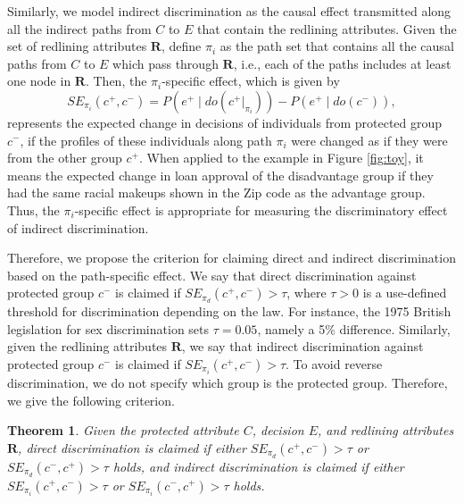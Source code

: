 \documentclass[letterpaper]{article}
\newtheorem{theorem}{Theorem}
\begin{document}
Similarly, we model indirect discrimination as the causal effect transmitted along all the indirect paths from $C$ to $E$ that contain the redlining attributes. Given the set of redlining attributes $\mathbf{R}$, define $\pi_{i}$ as the path set that contains all the causal paths from $C$ to $E$ which pass through $\mathbf{R}$, i.e., each of the paths includes at least one node in $\mathbf{R}$. Then, the $\pi_{i}$-specific effect, which is given by 
\begin{equation*}
SE_{\pi_{i}}(c^{+},c^{-}) = P(e^{+}\mid do(c^{+}|_{\pi_{i}})) - P(e^{+}\mid do(c^{-})), 
\end{equation*}
represents the expected change in decisions of individuals from protected group $c^{-}$, if the profiles of these individuals along path $\pi_{i}$ were changed as if they were from the other group $c^{+}$. When applied to the example in Figure \ref{fig:toy}, it means the expected change in loan approval of the disadvantage group if they had the same racial makeups shown in the Zip code as the advantage group. Thus, the $\pi_{i}$-specific effect is appropriate for measuring the discriminatory effect of indirect discrimination. 

Therefore, we propose the criterion for claiming direct and indirect discrimination based on the path-specific effect. We say that direct discrimination against protected group $c^{-}$ is claimed if $SE_{\pi_{d}}(c^{+},c^{-})>\tau$, where $\tau>0$ is a use-defined threshold for discrimination depending on the law. For instance, the 1975 British legislation for sex discrimination sets $\tau=0.05$, namely a 5\% difference. Similarly, given the redlining attributes $\mathbf{R}$, we say that indirect discrimination against protected group $c^{-}$ is claimed if $SE_{\pi_{i}}(c^{+},c^{-})>\tau$. To avoid reverse discrimination, we do not specify which group is the protected group. Therefore, we give the following criterion.
\begin{theorem}\label{thm:criterion}
Given the protected attribute $C$, decision $E$, and redlining attributes $\mathbf{R}$, direct discrimination is claimed if either $SE_{\pi_{d}}(c^{+},c^{-})>\tau$ or $SE_{\pi_{d}}(c^{-},c^{+})>\tau$ holds, and indirect discrimination is claimed if either $SE_{\pi_{i}}(c^{+},c^{-})>\tau$ or $SE_{\pi_{i}}(c^{-},c^{+})>\tau$ holds.
\end{theorem}
\end{document}
